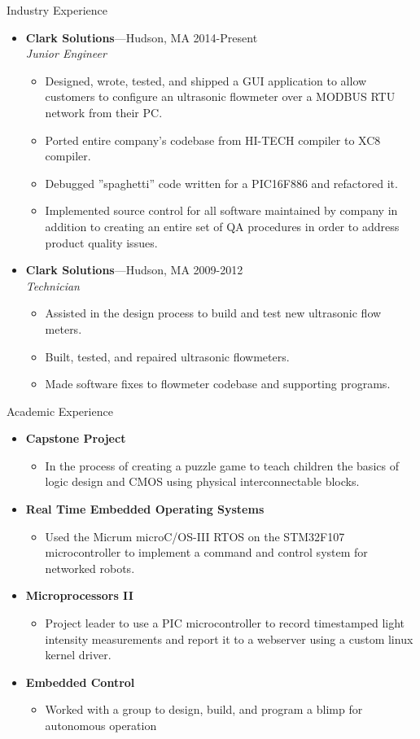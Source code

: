 \documentclass[10pt,oneside]{article}
\newenvironment{ressection}[1]{
	\vspace{4pt}
	{\fontfamily{phv}\selectfont\Large#1}
	\begin{itemize}
	\vspace{3pt}
}{
	\end{itemize}
}
\newcommand{\resitem}[1]{
	\vspace{-4pt}
	\item \begin{flushleft} #1 \end{flushleft}
}
\newcommand{\ressubitem}[1]{
	\vspace{-1pt}
	\item \begin{flushleft} #1 \end{flushleft}
}
\newcommand{\resbigitem}[3]{
	\vspace{-5pt}
	\item
	\textbf{#1}---#2 \\
	\textit{#3}
}
\newenvironment{ressubsec}[3]{
	\resbigitem{#1}{#2}{#3}
	\vspace{-2pt}
	\begin{itemize}
}{
	\end{itemize}
}
\newenvironment{reslist}[1]{
	\resitem{\textbf{#1}}
	\vspace{-5pt}
	\begin{itemize}
}{
	\end{itemize}
}
\begin{document}
\begin{ressection}{Industry Experience}

\begin{ressubsec}{Clark Solutions}{Hudson, MA \hfill 2014-Present}
{Junior Engineer}
\ressubitem{Designed, wrote, tested, and shipped a GUI application to allow customers to configure an ultrasonic flowmeter over a MODBUS RTU network from their PC.}
\ressubitem{Ported entire company's codebase from HI-TECH compiler to XC8 compiler.}
\ressubitem{Debugged ''spaghetti'' code written for a PIC16F886 and refactored it.}
\ressubitem{Implemented source control for all software maintained by company in addition to creating an entire set of QA procedures in order to address product quality issues.}
\end{ressubsec}

\begin{ressubsec}{Clark Solutions}{Hudson, MA \hfill 2009-2012}
{Technician}
\ressubitem{Assisted in the design process to build and test new ultrasonic flow meters.}
\ressubitem{Built, tested, and repaired ultrasonic flowmeters.}
\ressubitem{Made software fixes to flowmeter codebase and supporting programs.}

\end{ressubsec}


\end{ressection}

\begin{ressection}{Academic Experience}

\begin{reslist}{Capstone Project}
\ressubitem{In the process of creating a puzzle game to teach children the basics of logic design and CMOS using physical interconnectable blocks.}
\end{reslist}

\begin{reslist}{Real Time Embedded Operating Systems}
\ressubitem{Used the Micrum microC/OS-III RTOS on the STM32F107 microcontroller to implement a command and control system for networked robots.}
\end{reslist}

\begin{reslist}{Microprocessors II}
\ressubitem{Project leader to use a PIC microcontroller to record timestamped light intensity measurements and report it to a webserver using a custom linux kernel driver.}
\end{reslist}

\begin{reslist}{Embedded Control}
\ressubitem{Worked with a group to design, build, and program a blimp for autonomous operation}
\end{reslist}

\end{ressection}
\end{document}
